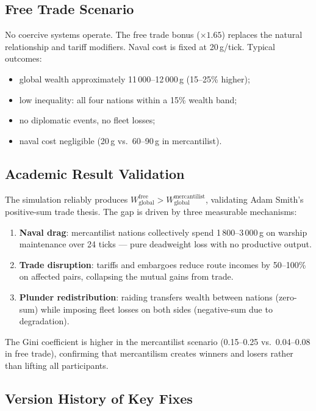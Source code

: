 \documentclass[12pt,a4paper]{article}
\begin{document}
\subsection{Free Trade Scenario}

No coercive systems operate. The free trade bonus ($\times 1.65$) replaces the natural relationship and tariff modifiers. Naval cost is fixed at 20\,g/tick. Typical outcomes:
\begin{itemize}
    \renewcommand{\labelitemi}{--}
    \item global wealth approximately 11\,000--12\,000\,g (15--25\% higher);
    \item low inequality: all four nations within a 15\% wealth band;
    \item no diplomatic events, no fleet losses;
    \item naval cost negligible (20\,g vs.\ 60--90\,g in mercantilist).
\end{itemize}

\subsection{Academic Result Validation}

The simulation reliably produces $W_{\text{global}}^{\text{free}} > W_{\text{global}}^{\text{mercantilist}}$, validating Adam Smith's positive-sum trade thesis. The gap is driven by three measurable mechanisms:

\begin{enumerate}
    \item \textbf{Naval drag}: mercantilist nations collectively spend 1\,800--3\,000\,g on warship maintenance over 24 ticks --- pure deadweight loss with no productive output.
    \item \textbf{Trade disruption}: tariffs and embargoes reduce route incomes by 50--100\% on affected pairs, collapsing the mutual gains from trade.
    \item \textbf{Plunder redistribution}: raiding transfers wealth between nations (zero-sum) while imposing fleet losses on both sides (negative-sum due to degradation).
\end{enumerate}

The Gini coefficient is higher in the mercantilist scenario (0.15--0.25 vs.\ 0.04--0.08 in free trade), confirming that mercantilism creates winners and losers rather than lifting all participants.

\subsection{Version History of Key Fixes}
\end{document}
